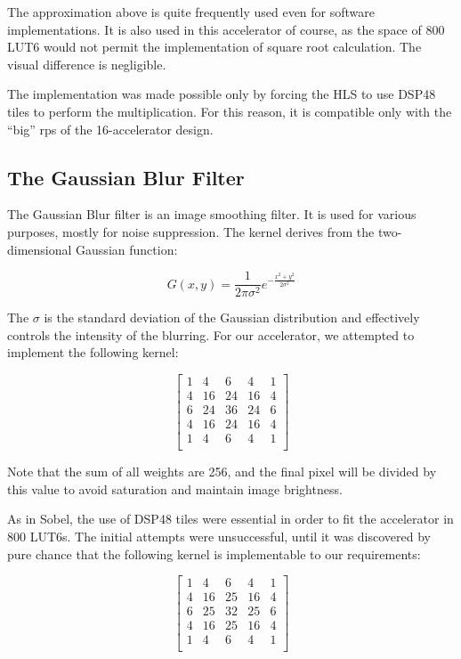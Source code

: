 The approximation above is quite frequently used even for software implementations.
It is also used in this accelerator of course, as the space of 800 LUT6 would not
permit the implementation of square root calculation. The visual difference is negligible.

The implementation was made possible only by forcing the HLS to use DSP48 tiles
to perform the multiplication. For this reason, it is compatible only with the 
``big'' \glspl{rp} of the 16-accelerator design.

\subsection{The Gaussian Blur Filter}
\label{sec:gaussian}

The Gaussian Blur filter is an image smoothing filter.
It is used for various purposes, mostly for noise suppression.
The kernel derives from the two-dimensional Gaussian function:

\[ G(x,y) = \frac{1}{2\pi\sigma^2} e^{-\frac{x^2 + y^2}{2\sigma^2}}	\]

The $\sigma$ is the standard deviation of the Gaussian distribution and effectively
controls the intensity of the blurring. For our accelerator, we attempted to implement
the following kernel:

\[
\left[
\begin{array}{rrrrr}
1  &   4  &  6  &  4  &  1 \\
4  &  16  &  24 & 16  &  4 \\
6  &  24  &  36 & 24  &  6 \\
4  &  16  &  24 & 16  &  4 \\
1  &   4  &  6  &  4  &  1 \\
\end{array}
\right]
\]

Note that the sum of all weights are 256, and the final pixel will be divided by this
value to avoid saturation and maintain image brightness.

As in Sobel, the use of DSP48 tiles were essential in order to fit the accelerator in 800 LUT6s.
The initial attempts were unsuccessful, until it was discovered by pure chance 
that the following kernel is implementable to our requirements:

\[
\left[
\begin{array}{rrrrr}
1  &   4  &  6  &  4  &  1 \\
4  &  16  &  25 & 16  &  4 \\
6  &  25  &  32 & 25  &  6 \\
4  &  16  &  25 & 16  &  4 \\
1  &   4  &  6  &  4  &  1 \\
\end{array}
\right]
\]

